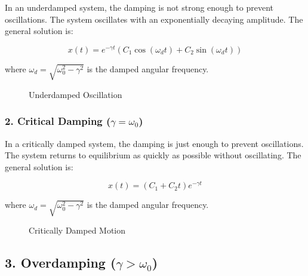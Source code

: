 \documentclass[a4paper,12pt]{article}
\begin{document}
In an underdamped system, the damping is not strong enough to prevent oscillations. The system oscillates with an exponentially decaying amplitude. The general solution is:

\[ x(t) = e^{-\gamma t} \left( C_1 \cos(\omega_d t) + C_2 \sin(\omega_d t) \right) \]

where \( \omega_d = \sqrt{\omega_0^2 - \gamma^2} \) is the damped angular frequency.

\begin{figure}[h]
\centering
{}
\caption{Underdamped Oscillation}
\end{figure}

\subsubsection*{2. Critical Damping (\( \gamma = \omega_0 \))}

In a critically damped system, the damping is just enough to prevent oscillations. The system returns to equilibrium as quickly as possible without oscillating. The general solution is:

\[ x(t) = (C_1 + C_2 t) e^{-\gamma t} \]

where \( \omega_d = \sqrt{\omega_0^2 - \gamma^2} \) is the damped angular frequency.

\begin{figure}[h]
\centering
{}
\caption{Critically Damped Motion}
\end{figure}

\subsection*{3. Overdamping (\( \gamma > \omega_0 \))}
\end{document}
